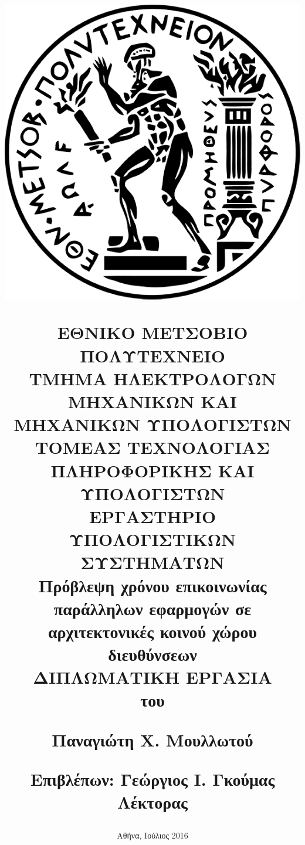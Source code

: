 \documentclass[a4paper,twoside,titlepage,11pt]{book}
\begin{document}
\title{
\vspace{-6ex}
\begin{center}
\includegraphics[scale=0.15]{logo.png}
\end{center}
\Large{Ε}\large{ΘΝΙΚΟ}
\Large{Μ}\large{ΕΤΣΟΒΙΟ}
\Large{Π}\large{ΟΛΥΤΕΧΝΕΙΟ} \\
\normalsize{Τ}\small{ΜΗΜΑ}
\normalsize{Η}\small{ΛΕΚΤΡΟΛΟΓΩΝ}
\normalsize{Μ}\small{ΗΧΑΝΙΚΩΝ}
\normalsize{Κ}\small{ΑΙ}
\normalsize{Μ}\small{ΗΧΑΝΙΚΩΝ}
\normalsize{Υ}\small{ΠΟΛΟΓΙΣΤΩΝ} \\
\vspace{2ex}
ΤΟΜΕΑΣ ΤΕΧΝΟΛΟΓΙΑΣ ΠΛΗΡΟΦΟΡΙΚΗΣ ΚΑΙ ΥΠΟΛΟΓΙΣΤΩΝ \\
ΕΡΓΑΣΤΗΡΙΟ ΥΠΟΛΟΓΙΣΤΙΚΩΝ ΣΥΣΤΗΜΑΤΩΝ \\
\vspace{8ex}
\large \textbf{Πρόβλεψη χρόνου επικοινωνίας παράλληλων εφαρμογών σε αρχιτεκτονικές κοινού χώρου διευθύνσεων} \\
\vspace{10ex}
\large
ΔΙΠΛΩΜΑΤΙΚΗ ΕΡΓΑΣΙΑ \\
\vspace{2ex}
\normalsize
του \\
\vspace{2ex}
\parbox[c]{0.8\textwidth} { \center\textbf{
Παναγιώτη Χ. Μουλλωτού }}
\vspace{10ex}
\flushleft	
\begin{tabbing}
	\textbf{Επιβλέπων}: \= Γεώργιος Ι. Γκούμας \\
			    \> Λέκτορας
\end{tabbing}
}
\date{
\normalsize
Αθήνα, Ιούλιος 2016}
\end{document}
